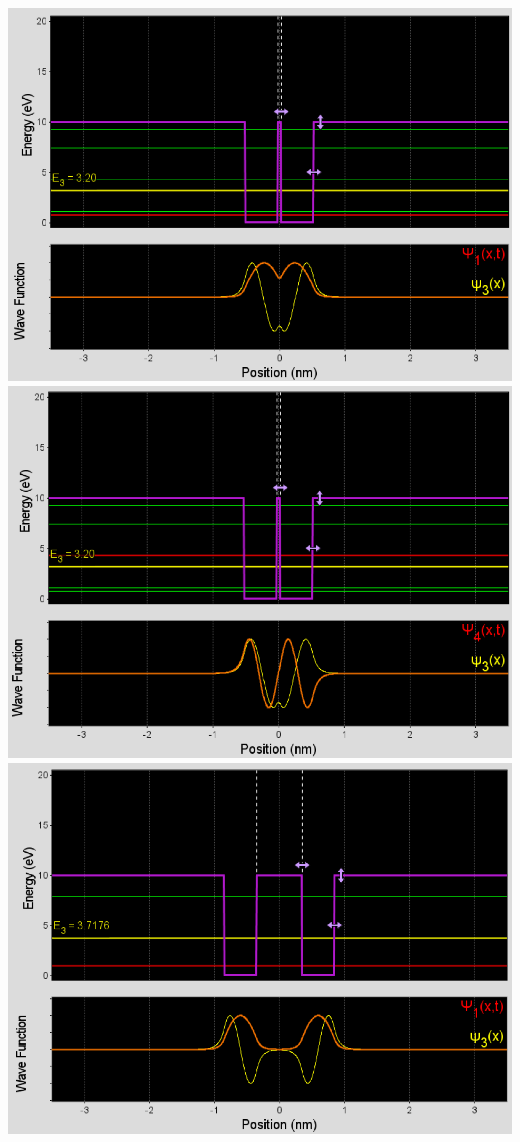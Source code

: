 \documentclass[11pt]{book}
\theoremstyle{break}
\theoremstyle{break}
\begin{document}
\begin{center}
\includegraphics[scale=0.38]{2a}
\includegraphics[scale=0.38]{2b}\\
\includegraphics[scale=0.38]{2c}

\end{center}
\end{document}
